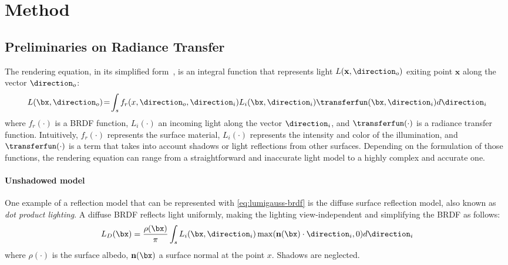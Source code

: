 
\section{Method}
  \label{sec:lumigauss-method}

  \subsection{Preliminaries on Radiance Transfer}
    \label{subsec:lumigauss-preliminaries}
    The rendering equation, in its simplified form~\cite{green2003grittydetail}, is an integral function that represents light $L(\mathbf{x}, \direction_o)$ exiting point $\mathbf{x}$ along the vector $\direction_o$:
    \begin{equation}
      \label{eq:lumigauss-brdf}
      L(\bx, \direction_o)\!
      =\!\int_{s} f_r(x, \direction_o, \direction_i) L_i(\bx, \direction_i) \transferfun(\bx, \direction_i) d\direction_i
    \end{equation}
    where $f_r(\cdot)$ is a BRDF function, $L_i(\cdot)$ an incoming light along the vector $\direction_i$, and $\transferfun(\cdot)$ is a radiance transfer function.
    Intuitively, $f_r(\cdot)$ represents the surface material, $L_i(\cdot)$
    represents the intensity and color of the illumination, and
    $\transferfun(\cdot)$ is a term that takes into account shadows or light
    reflections from other surfaces.
    Depending on the formulation of those functions, the rendering equation
    can range from a straightforward and inaccurate light model to a highly
    complex and accurate one.

    \paragraph{Unshadowed model}
      One example of a reflection model that can be represented with
      \cref{eq:lumigauss-brdf} is the diffuse surface reflection model, also
      known as \textit{dot product lighting}.
      A diffuse BRDF reflects light uniformly, making the lighting view-independent and simplifying the BRDF as follows:
      \begin{equation}
        \label{eq:lumigauss-dotillum}
        L_{D}(\bx) = \frac{\rho(\bx)}{\pi} \int_{s} L_i(\bx, \direction_i)
        \max(\mathbf{n}(\bx) \cdot \direction_i, 0) d\direction_i
        \end{equation} where $\rho(\cdot)$ is the surface albedo,
        $\mathbf{n}(\bx)$ a surface normal at the point $x$.
      Shadows are neglected.

